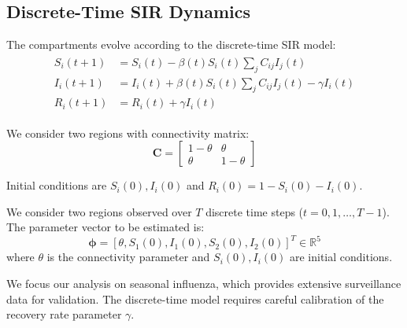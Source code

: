 \subsection{Discrete-Time SIR Dynamics}

The compartments evolve according to the discrete-time SIR model:
\begin{align}\begin{split}\label{eq:sir}
S_i(t+1) &= S_i(t) - \beta(t) S_i(t) \sum_j C_{ij} I_j(t) \\
I_i(t+1) &= I_i(t) + \beta(t) S_i(t) \sum_j C_{ij} I_j(t) - \gamma I_i(t) \\
R_i(t+1) &= R_i(t) + \gamma I_i(t)
\end{split}\end{align}

We consider two regions with connectivity matrix:
\begin{equation}
\mathbf{C} = \begin{bmatrix} 1-\theta & \theta \\ \theta & 1-\theta \end{bmatrix}
\end{equation}


Initial conditions are $S_i(0), I_i(0)$ and $R_i(0) = 1 - S_i(0) - I_i(0)$.

We consider two regions observed over $T$ discrete time steps ($t = 0,
1, \ldots, T-1$). The parameter vector to be estimated is:
\begin{equation}
\boldsymbol{\phi} = [\theta, S_1(0), I_1(0), S_2(0), I_2(0)]^T \in \mathbb{R}^5
\end{equation}
where $\theta$ is the connectivity parameter and $S_i(0), I_i(0)$ are initial conditions.

We focus our analysis on seasonal influenza, which provides extensive
surveillance data for validation. The discrete-time model requires
careful calibration of the recovery rate parameter $\gamma$.


